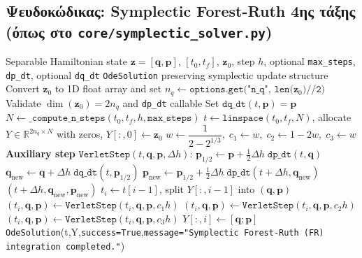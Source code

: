 \documentclass[11pt,a4paper]{report}
\begin{document}
\subsection*{Ψευδοκώδικας: Symplectic Forest-Ruth 4ης τάξης (όπως στο \texttt{core/symplectic\_solver.py})}
\begin{algorithm}[H]
\caption{\texttt{integrate\_system\_symplectic\_fr}}
\label{alg:fr4}
\begin{tcolorbox}[appendixalgobox]
\begin{algorithmic}[1]
\Require Separable Hamiltonian state $\mathbf{z}=[\mathbf{q},\mathbf{p}]$, $[t_0,t_f]$, $\mathbf{z}_0$, step $h$, optional \texttt{max\_steps}, \texttt{dp\_dt}, optional \texttt{dq\_dt}
\Ensure \texttt{OdeSolution} preserving symplectic update structure
\State Convert $\mathbf{z}_0$ to 1D float array and set $n_q \gets \texttt{options.get("n\_q", len(}\mathbf{z}_0\texttt{)//2)}$
\State Validate $\dim(\mathbf{z}_0)=2n_q$ and \texttt{dp\_dt} callable
  \State Set $\texttt{dq\_dt}(t,\mathbf{p})=\mathbf{p}$
\EndIf
\State $N \gets \texttt{\_compute\_n\_steps}(t_0,t_f,h,\texttt{max\_steps})$
\State $t \gets \texttt{linspace}(t_0,t_f,N)$,\; allocate $Y \in \mathbb{R}^{2n_q\times N}$ with zeros,\; $Y[:,0]\gets \mathbf{z}_0$
\State $w \gets \dfrac{1}{2-2^{1/3}},\; c_1\gets w,\; c_2\gets 1-2w,\; c_3\gets w$
\Statex
\State \textbf{Auxiliary step} $\texttt{VerletStep}(t,\mathbf{q},\mathbf{p},\Delta h)$:
\State \hspace{1em}$\mathbf{p}_{1/2} \gets \mathbf{p} + \tfrac{1}{2}\Delta h\;\texttt{dp\_dt}(t,\mathbf{q})$
\State \hspace{1em}$\mathbf{q}_{\text{new}} \gets \mathbf{q} + \Delta h\;\texttt{dq\_dt}(t,\mathbf{p}_{1/2})$
\State \hspace{1em}$\mathbf{p}_{\text{new}} \gets \mathbf{p}_{1/2} + \tfrac{1}{2}\Delta h\;\texttt{dp\_dt}(t+\Delta h,\mathbf{q}_{\text{new}})$
\State \hspace{1em}\Return $(t+\Delta h,\mathbf{q}_{\text{new}},\mathbf{p}_{\text{new}})$
\Statex
{}
  \State $t_i \gets t[i-1]$, split $Y[:,i-1]$ into $(\mathbf{q},\mathbf{p})$
  \State $(t_i,\mathbf{q},\mathbf{p}) \gets \texttt{VerletStep}(t_i,\mathbf{q},\mathbf{p},c_1h)$
  \State $(t_i,\mathbf{q},\mathbf{p}) \gets \texttt{VerletStep}(t_i,\mathbf{q},\mathbf{p},c_2h)$
  \State $(t_i,\mathbf{q},\mathbf{p}) \gets \texttt{VerletStep}(t_i,\mathbf{q},\mathbf{p},c_3h)$
  \State $Y[:,i] \gets [\mathbf{q};\mathbf{p}]$
\EndFor
\State \Return \texttt{OdeSolution}(t,Y,\texttt{success=True},\texttt{message="Symplectic Forest-Ruth (FR) integration completed."})
\end{algorithmic}
\end{tcolorbox}
\end{algorithm}
\end{document}
